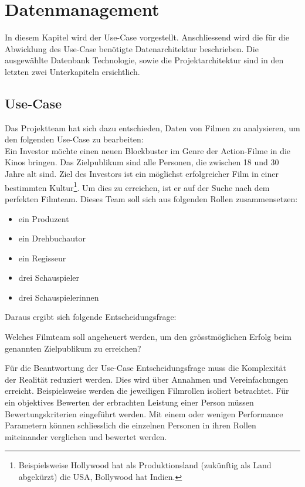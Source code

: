 \section{Datenmanagement}
In diesem Kapitel wird der Use-Case vorgestellt. Anschliessend wird die für die  Abwicklung des Use-Case benötigte Datenarchitektur beschrieben. Die ausgewählte Datenbank Technologie, sowie die Projektarchitektur sind in den letzten zwei Unterkapiteln ersichtlich.


\subsection{Use-Case}
\label{subsec: use case}

Das Projektteam hat sich dazu entschieden, Daten von Filmen zu analysieren, um den folgenden Use-Case zu bearbeiten:
\\
Ein Investor möchte einen neuen Blockbuster im Genre der Action-Filme in die Kinos bringen. Das Zielpublikum sind alle Personen, die zwischen 18 und 30 Jahre alt sind. Ziel des Investors ist ein möglichst erfolgreicher Film in einer bestimmten Kultur\footnote{Beispielsweise Hollywood hat als Produktionsland (zukünftig als Land abgekürzt) die USA, Bollywood hat Indien.}. Um dies zu erreichen, ist er auf der Suche nach dem perfekten Filmteam. Dieses Team soll sich aus folgenden Rollen zusammensetzen:
\begin{itemize}
	\item ein Produzent
	\item ein Drehbuchautor
	\item ein Regisseur
	\item drei Schauspieler
	\item drei Schauspielerinnen
\end{itemize}

Daraus ergibt sich folgende Entscheidungsfrage:\\
\begin{tcolorbox}
    Welches Filmteam soll angeheuert werden, um den grösstmöglichen Erfolg beim genannten Zielpublikum zu erreichen?
\end{tcolorbox}

Für die Beantwortung der Use-Case Entscheidungsfrage muss die Komplexität der Realität reduziert werden. Dies wird über Annahmen und Vereinfachungen erreicht. Beispielsweise werden die jeweiligen Filmrollen isoliert betrachtet. Für ein objektives Bewerten der erbrachten Leistung einer Person müssen Bewertungskriterien eingeführt werden. Mit einem oder wenigen Performance Parametern können schliesslich die einzelnen Personen in ihren Rollen miteinander verglichen und bewertet werden.



